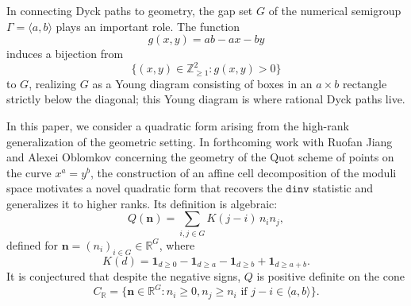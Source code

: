 \documentclass[11pt,reqno]{amsart}
\theoremstyle{remark}
\begin{document}
In connecting Dyck paths to geometry, the gap set $G$ of the numerical semigroup $\Gamma=\langle a,b\rangle$ plays an important role. The function
\[ g(x,y)=ab-ax-by\]
induces a bijection from
\begin{equation}\label{eq:gap-diagram}
    \{(x,y)\in \mathbb{Z}_{\geq 1}^2:g(x,y)>0\}
\end{equation}
to $G$, realizing $G$ as a Young diagram consisting of boxes in an $a\times b$ rectangle strictly below the diagonal; this Young diagram is where rational Dyck paths live. 

In this paper, we consider a quadratic form arising from the high-rank generalization of the geometric setting. In forthcoming work \cite{HJO26+} with Ruofan Jiang and Alexei Oblomkov concerning the geometry of the Quot scheme of points on the curve $x^a=y^b$, the construction of an affine cell decomposition of the moduli space motivates a novel quadratic form that recovers the $\mathtt{dinv}$ statistic and generalizes it to higher ranks. Its definition is algebraic:
\[
Q(\mathbf{n})=\sum_{i,j\in G}  K(j-i)\,n_{i}n_{j},\]
defined for $\mathbf{n}=(n_i)_{i\in G}\in \mathbb{R}^G$,
where
\[K(d)=\mathbf{1}_{d\geq 0}-\mathbf{1}_{d\geq a}-\mathbf{1}_{d\geq b}+\mathbf{1}_{d\geq a+b}.
\]
It is conjectured that despite the negative signs, $Q$ is positive definite on the cone 
\[ C_{\mathbb{R}}=\{\mathbf{n}\in \mathbb{R}^G:n_i\geq 0, n_j\geq n_i\text{ if }j-i\in \langle a,b\rangle\}.\]
\end{document}
